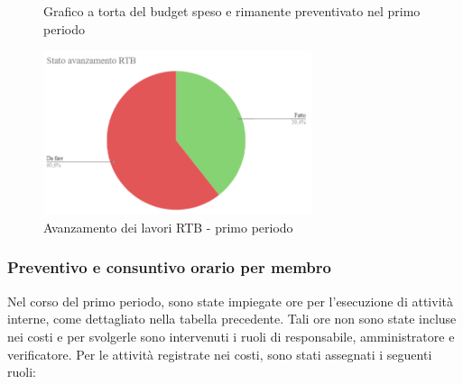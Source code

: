   \begin{figure}[ht]
    \centering
    \begin{minipage}[b]{0.45\textwidth}
        \centering
        \caption{Grafico a torta del budget speso e rimanente preventivato nel primo periodo}
        \label{fig:GraficoTorta}
    \end{minipage}
    
    \vspace{1cm}

    \begin{minipage}[b]{0.70\textwidth}
        \centering
        \includegraphics[width=0.7\textwidth]{../Images/avanzamento1Periodo.png}
        \caption{Avanzamento dei lavori RTB - primo periodo}
        \label{fig:AvRtb1}
    \end{minipage}
\end{figure}

\subsubsection*{Preventivo e consuntivo orario per membro}
Nel corso del primo periodo, sono state impiegate ore per l'esecuzione di attività interne, come dettagliato nella tabella precedente. Tali ore non sono state incluse nei costi e per svolgerle sono intervenuti i ruoli di responsabile, amministratore e verificatore.
Per le attività registrate nei costi, sono stati assegnati i seguenti ruoli:

